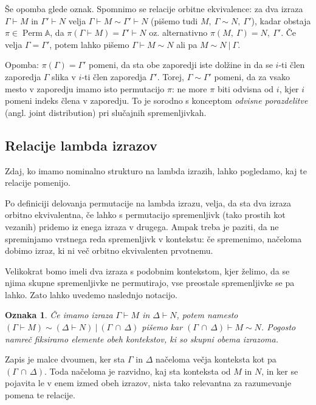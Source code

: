 \documentclass{article}
\DeclareMathOperator{\Perm}{Perm}
\newtheorem{oznaka}{Oznaka}
\begin{document}
Še opomba glede oznak.
Spomnimo se relacije orbitne ekvivalence: za dva izraza \(\Gamma \vdash M\) in \(\Gamma' \vdash N\) velja \(\Gamma \vdash M \sim \Gamma' \vdash N\) (pišemo tudi \(M,\ \Gamma \sim N,\ \Gamma'\)), kadar obstaja \(\pi \in \Perm{\mathds{A}}\), da \(\pi(\Gamma \vdash M) = \Gamma' \vdash N\) oz. alternativno \(\pi(M,\ \Gamma) = N,\ \Gamma'\). Če velja \(\Gamma = \Gamma'\), potem lahko pišemo \(\Gamma \vdash M \sim N\) ali pa \(M \sim N \ \vert\ \Gamma\).

Opomba: \(\pi(\Gamma) = \Gamma'\) pomeni, da sta obe zaporedji iste dolžine in da se \(i\)-ti člen zaporedja \(\Gamma\) slika v \(i\)-ti člen zaporedja \(\Gamma'\). Torej, \(\Gamma \sim \Gamma'\) pomeni, da za vsako mesto v zaporedju imamo isto permutacijo \(\pi\): ne more \(\pi\) biti odvisna od \(i\), kjer \(i\) pomeni indeks člena v zaporedju. To je sorodno s konceptom \emph{odvisne porazdelitve} (angl. joint distribution) pri slučajnih spremenljivkah.

\subsection{Relacije lambda izrazov}

Zdaj, ko imamo nominalno strukturo na lambda izrazih, lahko pogledamo, kaj te relacije pomenijo.

Po definiciji delovanja permutacije na lambda izrazu, velja, da sta dva izraza orbitno ekvivalentna, če lahko s permutacijo spremenljivk (tako prostih kot vezanih) pridemo iz enega izraza v drugega. Ampak treba je paziti, da ne spreminjamo vrstnega reda spremenljivk v kontekstu: če spremenimo, načeloma dobimo izraz, ki ni več orbitno ekvivalenten prvotnemu.

Velikokrat bomo imeli dva izraza s podobnim kontekstom, kjer želimo, da se njima skupne spremenljivke ne permutirajo, vse preostale spremenljivke se pa lahko. Zato lahko uvedemo naslednjo notacijo.

\begin{oznaka}
    Če imamo izraza \(\Gamma \vdash M\) in \(\Delta \vdash N\), potem namesto \((\Gamma \vdash M) \sim (\Delta \vdash N) \ \vert\ (\Gamma\, \cap\, \Delta)\) pišemo kar \((\Gamma\, \cap\, \Delta) \vdash M \sim N\). Pogosto namreč fiksiramo elemente obeh kontekstov, ki so skupni obema izrazoma.
\end{oznaka}

Zapis je malce dvoumen, ker sta \(\Gamma\) in \(\Delta\) načeloma večja konteksta kot pa \((\Gamma\, \cap\, \Delta)\). Toda načeloma je razvidno, kaj sta konteksta od \(M\) in \(N\), in ker se pojavita le v enem izmed obeh izrazov, nista tako relevantna za razumevanje pomena te relacije.
\end{document}
